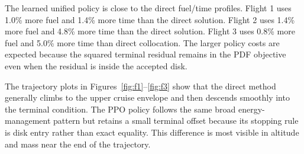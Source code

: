 \documentclass[11pt,a4paper]{article}
\begin{document}
\begin{table}[h]
\centering
\caption{Direct collocation and unified PPO policy results.}
\label{tab:summary}
\scriptsize
{}
\end{table}

The learned unified policy is close to the direct fuel/time profiles. Flight 1
uses 1.0\% more fuel and 1.4\% more time than the direct solution.
Flight 2 uses 1.4\% more fuel and 4.8\% more time than the direct solution.
Flight 3 uses 0.8\% more fuel and 5.0\% more time than direct
collocation. The larger policy costs are expected because the squared
terminal residual remains in the PDF objective even when the residual is
inside the accepted disk.

The trajectory plots in Figures~\ref{fig:f1}--\ref{fig:f3} show that
the direct method generally climbs to the upper cruise envelope and then
descends smoothly into the terminal condition. The PPO policy follows
the same broad energy-management pattern but retains a small terminal
offset because its stopping rule is disk entry rather than exact
equality. This difference is most visible in altitude and mass near the
end of the trajectory.
\end{document}

